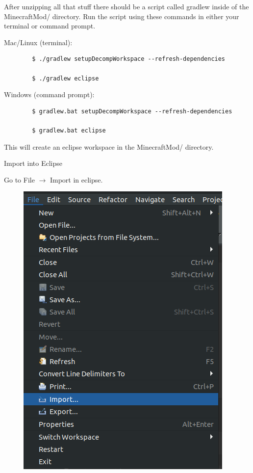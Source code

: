\documentclass[12pt]{article}
\begin{document}
\begin{steps}
	  After unzipping all that stuff there should be a script called gradlew inside of the MinecraftMod/ directory. Run the script using these commands in either your terminal or command prompt.

		Mac/Linux (terminal):
	\begin{verbatim}
		$ ./gradlew setupDecompWorkspace --refresh-dependencies
		
		$ ./gradlew eclipse
	\end{verbatim}

		Windows (command prompt):

	\begin{verbatim}
		$ gradlew.bat setupDecompWorkspace --refresh-dependencies
		
		$ gradlew.bat eclipse
	\end{verbatim}

	This will create an eclipse workspace in the MinecraftMod/ directory.

  \item Import into Eclipse

	  Go to File $\rightarrow$ Import in eclipse.

	\begin{figure}[H]
		\includegraphics[scale=0.3]{images/setup/FileImport.png}
		\centering
	\end{figure}



\end{steps}
\end{document}
